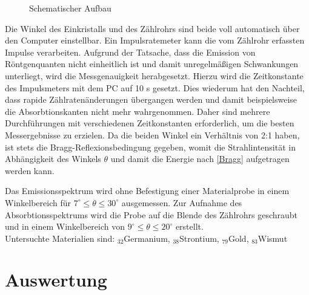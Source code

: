 \begin{figure}[H]
\centering
\caption{Schematischer Aufbau}
\label{Aufbau}
\end{figure}


Die Winkel des Einkristalls und des Zählrohrs sind beide voll automatisch über den Computer einstellbar. Ein Impulsratemeter
kann die vom Zählrohr erfassten Impulse verarbeiten. Aufgrund der Tatsache, dass die Emission von Röntgenquanten nicht
einheitlich ist und damit unregelmäßigen Schwankungen unterliegt, wird die Messgenauigkeit herabgesetzt. Hierzu wird die
Zeitkonstante des Impulsmeters mit dem PC auf 10 s gesetzt. Dies wiederum hat den Nachteil, dass rapide Zählratenänderungen
übergangen werden und damit beispielsweise die Absorbtionskanten nicht mehr wahrgenommen. Daher sind mehrere Durchführungen
mit verschiedenen Zeitkonstanten erforderlich, um die besten Messergebnisse zu erzielen. Da die beiden Winkel ein Verhältnis
von 2:1 haben, ist stets die Bragg-Reflexionsbedingung gegeben, womit die Strahlintensität in Abhängigkeit des Winkels
$\theta$ und damit die Energie nach \eqref{Bragg} aufgetragen werden kann.

Das Emissionsspektrum wird ohne Befestigung einer Materialprobe in einem Winkelbereich für $7^\circ \le \theta \le 30^\circ$ ausgemessen.
Zur Aufnahme des Absorbtionsspektrums wird die Probe auf die Blende des Zählrohrs geschraubt und in einem Winkelbereich von
$9^\circ \le \theta \le 20^\circ$ erstellt.\\
Untersuchte Materialien sind: $_{32}$Germanium, $_{38}$Strontium, $_{79}$Gold, $_{83}$Wismut

 
\section{Auswertung}
